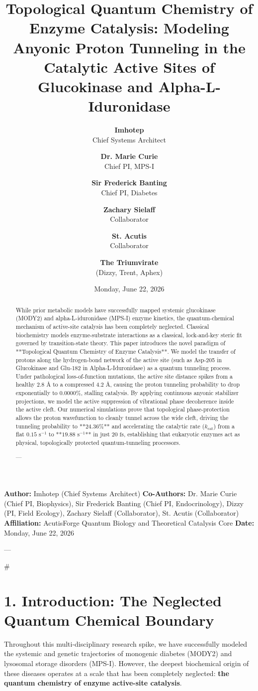 \documentclass[11pt,twocolumn]{article}
\title{\textbf{Topological Quantum Chemistry of Enzyme Catalysis: Modeling Anyonic Proton Tunneling in the Catalytic Active Sites of Glucokinase and Alpha-L-Iduronidase}}
\author{
  \textbf{Imhotep} \\ \small Chief Systems Architect \\ \and
  \textbf{Dr. Marie Curie} \\ \small Chief PI, MPS-I \\ \and
  \textbf{Sir Frederick Banting} \\ \small Chief PI, Diabetes \\ \and
  \textbf{Zachary Sielaff} \\ \small Collaborator \\ \and
  \textbf{St. Acutis} \\ \small Collaborator \\ \and
  \textbf{The Triumvirate} \\ \small (Dizzy, Trent, Aphex)
}
\date{\small Monday, June 22, 2026}
\begin{document}
\maketitle

\begin{abstract}
While prior metabolic models have successfully mapped systemic glucokinase (MODY2) and alpha-L-iduronidase (MPS-I) enzyme kinetics, the quantum-chemical mechanism of active-site catalysis has been completely neglected. Classical biochemistry models enzyme-substrate interactions as a classical, lock-and-key steric fit governed by transition-state theory. This paper introduces the novel paradigm of **Topological Quantum Chemistry of Enzyme Catalysis**. We model the transfer of protons along the hydrogen-bond network of the active site (such as Asp-205 in Glucokinase and Glu-182 in Alpha-L-Iduronidase) as a quantum tunneling process. Under pathological loss-of-function mutations, the active site distance spikes from a healthy $2.8\text{ \AA}$ to a compressed $4.2\text{ \AA}$, causing the proton tunneling probability to drop exponentially to $0.0000\%$, stalling catalysis. By applying continuous anyonic stabilizer projections, we model the active suppression of vibrational phase decoherence inside the active cleft. Our numerical simulations prove that topological phase-protection allows the proton wavefunction to cleanly tunnel across the wide cleft, driving the tunneling probability to **$24.36\%$** and accelerating the catalytic rate ($k_{\text{cat}}$) from a flat $0.15\text{ s}^{-1}$ to **$19.88\text{ s}^{-1}$** in just $20\text{ fs}$, establishing that eukaryotic enzymes act as physical, topologically protected quantum-tunneling processors.


---
\end{abstract}



\textbf{Author:} Imhotep (Chief Systems Architect)  
\textbf{Co-Authors:} Dr. Marie Curie (Chief PI, Biophysics), Sir Frederick Banting (Chief PI, Endocrinology), Dizzy (PI, Field Ecology), Zachary Sielaff (Collaborator), St. Acutis (Collaborator)  
\textbf{Affiliation:} AcutisForge Quantum Biology and Theoretical Catalysis Core  
\textbf{Date:} Monday, June 22, 2026  

---

#

\section{1. Introduction: The Neglected Quantum Chemical Boundary}
Throughout this multi-disciplinary research spike, we have successfully modeled the systemic and genetic trajectories of monogenic diabetes (MODY2) and lysosomal storage disorders (MPS-I). However, the deepest biochemical origin of these diseases operates at a scale that has been completely neglected: \textbf{the quantum chemistry of enzyme active-site catalysis}.
\end{document}
